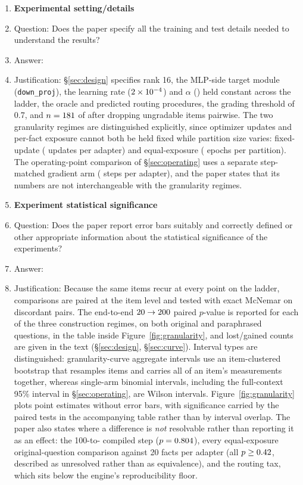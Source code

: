 \begin{enumerate}
\item {\bf Experimental setting/details}
    \item[] Question: Does the paper specify all the training and test details
    needed to understand the results?
    \item[] Answer: \answerYes{}
    \item[] Justification: \S\ref{sec:design} specifies rank 16, the MLP-side
    target module (\texttt{down\_proj}), the learning rate ($2\times10^{-4}{}$)
    and $\alpha$ (\LoraAlpha{}) held constant across the ladder, the oracle and
    predicted routing procedures, the grading threshold of 0.7, and
    $n=181{}$ of \NPerArm{} after dropping ungradable items pairwise. The
    two granularity regimes are distinguished explicitly, since optimizer
    updates and per-fact exposure cannot both be held fixed while partition size
    varies: fixed-update (\SeedSteps{} updates per adapter) and equal-exposure
    (\ExpEpochs{} epochs per partition). The operating-point comparison of
    \S\ref{sec:operating} uses a separate step-matched gradient arm
    (\SgdOptSteps{} steps per adapter), and the paper states that its numbers
    are not interchangeable with the granularity regimes.

\item {\bf Experiment statistical significance}
    \item[] Question: Does the paper report error bars suitably and correctly
    defined or other appropriate information about the statistical significance
    of the experiments?
    \item[] Answer: \answerYes{}
    \item[] Justification: Because the same \NPerArm{} items recur at every
    point on the ladder, comparisons are paired at the item level and tested
    with exact McNemar on discordant pairs. The end-to-end $20\to200{}$
    paired $p$-value is reported for each of the three construction regimes, on
    both original and paraphrased questions, in the table inside
    Figure~\ref{fig:granularity}, and lost/gained counts are given in the text
    (\S\ref{sec:design}, \S\ref{sec:curve}). Interval types are distinguished:
    granularity-curve aggregate intervals use an item-clustered bootstrap that
    resamples items and carries all of an item's measurements together, whereas
    single-arm binomial intervals, including the full-context 95\% interval in
    \S\ref{sec:operating}, are Wilson intervals.
    Figure~\ref{fig:granularity} plots point estimates
    without error bars, with significance carried by the paired tests in the
    accompanying table rather than by interval overlap. The paper also states
    where a difference is \emph{not} resolvable rather than reporting it as an
    effect: the 100-to-\NPerArm{} compiled step
    ($p=0.804{}$), every equal-exposure original-question
    comparison against 20 facts per adapter (all $p\ge0.42{}$, described as
    unresolved rather than as equivalence), and the routing tax, which sits
    below the engine's reproducibility floor.


\end{enumerate}
